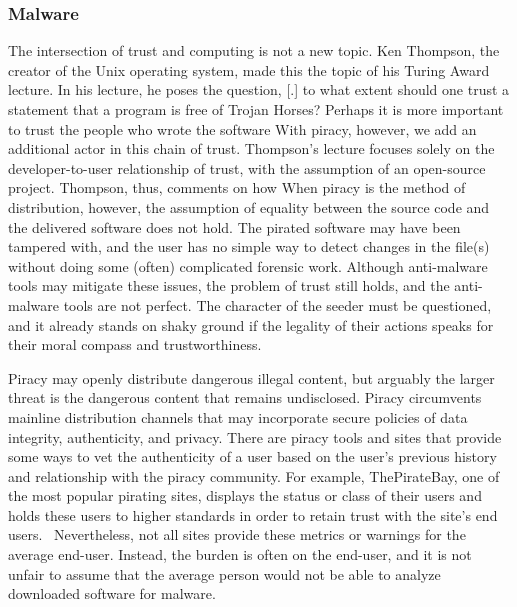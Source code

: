 \documentclass[onecolumn, 12pt]{article}
\begin{document}
\subsubsection{Malware}
The intersection of trust and computing is not a new topic. Ken Thompson, the
creator of the Unix operating system, made this the topic of his Turing Award
lecture. In his lecture, he poses the question,
[.]{%
  to what extent should one trust a statement that
  a program is free of Trojan Horses? Perhaps it is more important to trust the
  people who wrote the software%
} With piracy, however, we add an additional actor in this chain of trust.
Thompson's lecture focuses solely on the developer-to-user relationship of
trust, with the assumption of an open-source project. Thompson, thus, comments
on how  When piracy is the method of distribution, however, the assumption of
equality between the source code and the delivered software does not hold. The
pirated software may have been tampered with, and the user has no simple way to
detect changes in the file(s) without doing some (often) complicated forensic
work. Although anti-malware tools may mitigate these issues, the problem of
trust still holds, and the anti-malware tools are not perfect. The character of
the seeder must be questioned, and it already stands on shaky ground if the
legality of their actions speaks for their moral compass and trustworthiness.

Piracy may openly distribute dangerous illegal content, but arguably the
larger threat is the dangerous content that remains undisclosed. Piracy
circumvents mainline distribution channels that may incorporate secure policies
of data integrity, authenticity, and privacy. There are piracy tools and sites
that provide some ways to vet the authenticity of a user based on the user's
previous history and relationship with the piracy community. For example,
ThePirateBay, one of the most popular pirating sites, displays the status or
class of their users and holds these users to higher standards in order to
retain trust with the site's end users.~\cite{suprbay:status} Nevertheless, not
all sites provide these metrics or warnings for the average end-user. Instead,
the burden is often on the end-user, and it is not unfair to assume that the
average person would not be able to analyze downloaded software for malware.
\end{document}
